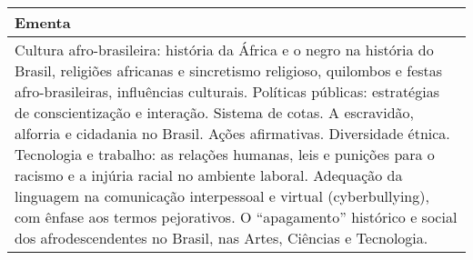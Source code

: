\begin{quadro}[ht!]
\begin{tabular}{|p{3cm} p{2cm} p{3cm} p{2cm} p{3cm} p{2cm}|}
\multicolumn{6}{|p{15cm}|}{\cellcolor{blue1} Ementa} \\\hline
\hline\multicolumn{6}{|p{15cm}|}{\scriptsize Cultura afro-brasileira: história da África e o negro na história do Brasil, religiões africanas e sincretismo religioso, quilombos e festas afro-brasileiras, influências culturais. Políticas públicas: estratégias de conscientização e interação. Sistema de cotas. A escravidão, alforria e cidadania no Brasil. Ações afirmativas. Diversidade étnica. Tecnologia e trabalho:  as relações humanas, leis e punições para o racismo e a injúria racial no ambiente laboral. Adequação da linguagem na comunicação interpessoal e virtual (cyberbullying), com ênfase   aos termos pejorativos. O ``apagamento'' histórico e social dos afrodescendentes no Brasil, nas Artes, Ciências e Tecnologia.}\\\hline 
\hline
	\end{tabular}
\end{quadro}


